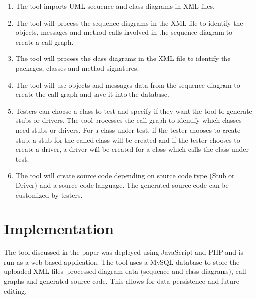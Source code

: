 \documentclass{article}
\begin{document}
\begin{enumerate}
    \item The tool imports UML sequence and class diagrams in XML files.
    \item The tool will process the sequence diagrams in the XML file to identify the objects, messages and method calls involved in the sequence diagram to create a call graph.
    \item The tool will process the class diagrams in the XML file to identify the packages, classes and method signatures.
    \item The tool will use objects and messages data from the sequence diagram to create the call graph and save it into the database.
    \item Testers can choose a class to test and specify if they want the tool to generate stubs or drivers. The tool processes the call graph to identify which classes need stubs or drivers. For a class under test, if the tester chooses to create stub, a stub for the called class will be created and if the tester chooses to create a driver, a driver will be created for a class which calls the class under test.
    \item The tool will create source code depending on source code type (Stub or Driver) and a source code language. The generated source code can be customized by testers.
    
    
\end{enumerate}









\section{Implementation}
The tool discussed in the paper was deployed using JavaScript and PHP and is run as a web-based application. The tool uses a MySQL database to store the uploaded XML files, processed diagram data (sequence and class diagrams), call graphs and generated source code. This allows for data persistence and future editing.\\
\end{document}
